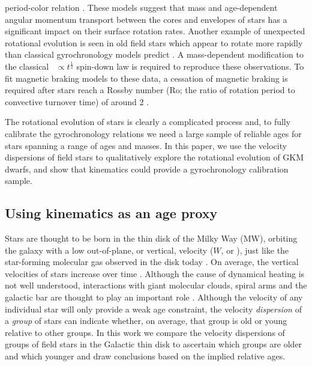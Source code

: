 period-color relation \citep{spada2019}.
These models suggest that mass and age-dependent angular momentum transport
between the cores and envelopes of stars has a significant impact on their
surface rotation rates.
Another example of unexpected rotational evolution is seen in old field stars
which appear to rotate more rapidly than classical gyrochronology models
predict \citep{angus2015, vansaders2016, vansaders2018, metcalfe2019}.
A mass-dependent modification to the classical \prot\ $\propto
t^{\frac{1}{2}}$ spin-down law \citep{skumanich1972} is required to reproduce
these observations.
To fit magnetic braking models to these data, a cessation of magnetic braking
is required after stars reach a Rossby number (Ro; the ratio of rotation
period to convective turnover time) of around 2 \citep{vansaders2016,
vansaders2018}.

The rotational evolution of stars is clearly a complicated process and, to
fully calibrate the gyrochronology relations we need a large sample of
reliable ages for stars spanning a range of ages and masses.
In this paper, we use the velocity dispersions of field stars to qualitatively
explore the rotational evolution of GKM dwarfs, and show that kinematics could
provide a gyrochronology calibration sample.

\subsection{Using kinematics as an age proxy}

Stars are thought to be born in the thin disk of the Milky Way (MW), orbiting
the galaxy with a low out-of-plane, or vertical, velocity ($W$, or \vz),
just like the star-forming molecular gas observed in the disk today
\citep[\eg][]{stark1989, stark2005, aumer2009, martig2014, aumer2016}.
On average, the vertical velocities of stars increase over time
\citep[\eg][]{nordstrom2004, holmberg2007, holmberg2009, aumer2009,
casagrande2011}.
Although the cause of dynamical heating is not well understood, interactions
with giant molecular clouds, spiral arms and the galactic bar are thought to
play an important role \citep[see][for a review of secular evolution in the
MW]{sellwood2014}.
Although the velocity of any individual star will only provide a weak age
constraint, the velocity {\it dispersion} of a {\it group} of stars can
indicate whether, on average, that group is old or young relative to other
groups.
In this work we compare the velocity dispersions of groups of field stars in
the Galactic thin disk to ascertain which groups are older and which younger
and draw conclusions based on the implied relative ages.

